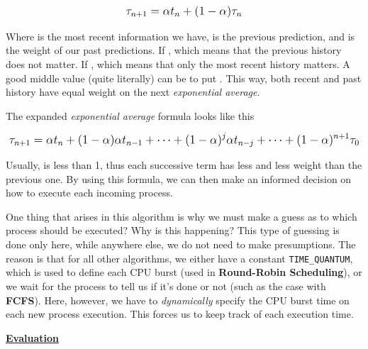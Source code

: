 \documentclass{article}
\newcommand{\code}[1]{\colorbox{codebg}{{\color{black}\texttt{#1}}}}
\begin{document}
\begin{equation}
  \mathlarger{\tau_{n+1} = \alpha t_{n} + (1 - \alpha)\tau_{n}}
\end{equation}

Where  is the most recent information we have,  is the previous prediction, and \scalebox{1.1}{\(\alpha\)} is the weight of our past predictions. If , which means that the previous history does not matter. If , which means that only the most recent history matters. A good middle value (quite literally) can be to put . This way, both recent and past history have equal weight on the next \textit{exponential average}.

The expanded \textit{exponential average} formula looks like this

\begin{equation}
  \mathlarger{\tau_{n+1} = \alpha t_{n} + (1 - \alpha)\alpha t_{n - 1} + \dots + (1 - \alpha)^{j} \alpha t_{n - j} + \dots + (1 - \alpha)^{n + 1} \tau_{0}}
\end{equation}

Usually, \scalebox{1.1}{\(\alpha\)} is less than 1, thus each successive term has less and less weight than the previous one. By using this formula, we can then make an informed decision on how to execute each incoming process.

One thing that arises in this algorithm is why we must make a guess as to which process should be executed? Why is this happening? This type of guessing is done only here, while anywhere else, we do not need to make presumptions. The reason is that for all other algorithms, we either have a constant \code{TIME\_QUANTUM}, which is used to define each CPU burst (used in \textbf{Round-Robin Scheduling}), or we wait for the process to tell us if it's done or not (such as the case with \textbf{FCFS}). Here, however, we have to \textit{dynamically} specify the CPU burst time on each new process execution. This forces us to keep track of each execution time.

\underline{\textbf{Evaluation}}
\end{document}
